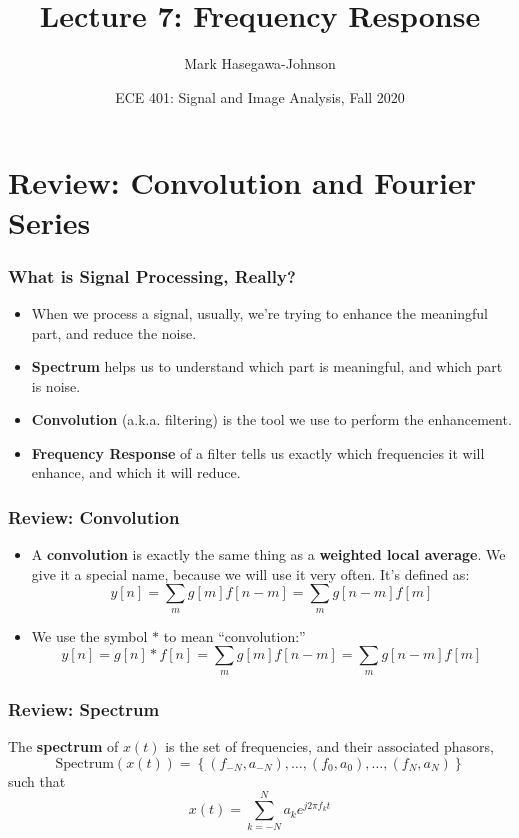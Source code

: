 \documentclass{beamer}
\title{Lecture 7: Frequency Response}
\author{Mark Hasegawa-Johnson}
\date{ECE 401: Signal and Image Analysis, Fall 2020}
\begin{document}
\begin{frame}
  \maketitle
\end{frame}

\begin{frame}
  \tableofcontents
\end{frame}

\section[Review]{Review: Convolution and Fourier Series}
\setcounter{subsection}{1}

\begin{frame}
  \frametitle{What is Signal Processing, Really?}

  \begin{itemize}
  \item When we process a signal, usually, we're trying to
    enhance the meaningful part, and reduce the noise.
  \item {\bf Spectrum} helps us  to understand which part is
    meaningful, and which part is noise.
  \item {\bf Convolution} (a.k.a. filtering) is the tool we use to
    perform the enhancement.
  \item {\bf Frequency Response} of a filter tells us exactly which
    frequencies it will enhance, and which it will reduce.
  \end{itemize}
\end{frame}

\begin{frame}
  \frametitle{Review: Convolution}
  \begin{itemize}
  \item A {\bf convolution} is exactly the same thing as a {\bf weighted local average}.
    We give it a special name, because we will use it very often.  It's defined as:
    \[
    y[n] = \sum_m g[m] f[n-m] = \sum_m g[n-m] f[m]
    \]
  \item 
    We use the symbol $\ast$ to mean ``convolution:''
    \[
    y[n]=g[n]\ast f[n] = \sum_m g[m] f[n-m] = \sum_m g[n-m] f[m]
    \]
  \end{itemize}
\end{frame}

\begin{frame}
  \frametitle{Review: Spectrum}

  The {\bf spectrum} of $x(t)$ is the set of frequencies, and their
  associated phasors,
  \[
  \mbox{Spectrum}\left( x(t) \right) =
  \left\{ (f_{-N},a_{-N}), \ldots, (f_0,a_0), \ldots, (f_N,a_N) \right\}
  \]
  such that
  \[
  x(t) = \sum_{k=-N}^N a_ke^{j2\pi f_kt}
  \]
\end{frame}
\end{document}
